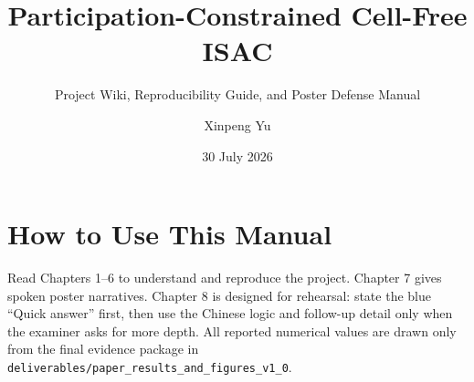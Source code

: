 \documentclass[lang=cn,color=blue,math=cm,device=normal]{elegantbook}
\title{Participation-Constrained Cell-Free ISAC}
\subtitle{Project Wiki, Reproducibility Guide, and Poster Defense Manual}
\author{Xinpeng Yu}
\institute{UNSW Sydney --- School of Electrical Engineering and Telecommunications}
\date{30 July 2026}
\begin{document}
\maketitle
\frontmatter
\tableofcontents

\chapter*{How to Use This Manual}
Read Chapters 1--6 to understand and reproduce the project. Chapter 7 gives
spoken poster narratives. Chapter 8 is designed for rehearsal: state the blue
``Quick answer'' first, then use the Chinese logic and follow-up detail only
when the examiner asks for more depth. All reported numerical values are drawn
only from the final evidence package in
\texttt{deliverables/paper\_results\_and\_figures\_v1\_0}.

\mainmatter









\appendix


\backmatter
\end{document}
